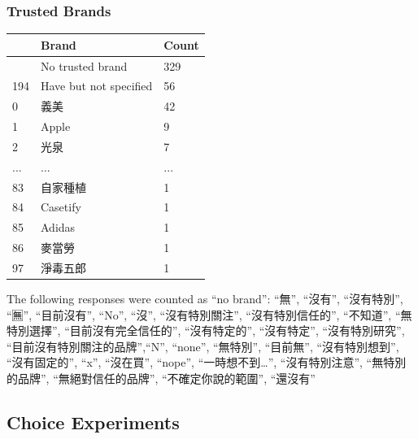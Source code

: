 \documentclass[
  letterpaper,
  DIV=11,
  numbers=noendperiod]{scrartcl}
\begin{document}
\subsubsection{Trusted Brands}\label{trusted-brands}

\begin{longtable}[]{@{}lll@{}}
\toprule\noalign{}
& Brand & Count \\
\midrule\noalign{}
\endhead
\bottomrule\noalign{}
\endlastfoot
193 & No trusted brand & 329 \\
194 & Have but not specified & 56 \\
0 & 義美 & 42 \\
1 & Apple & 9 \\
2 & 光泉 & 7 \\
... & ... & ... \\
83 & 自家種植 & 1 \\
84 & Casetify & 1 \\
85 & Adidas & 1 \\
86 & 麥當勞 & 1 \\
97 & 淨毒五郎 & 1 \\
\end{longtable}

The following responses were counted as ``no brand'': ``無'', ``沒有'',
``沒有特別'', ``🈚️'', ``目前沒有'', ``No'', ``沒'', ``沒有特別關注'',
``沒有特別信任的'', ``不知道'', ``無特別選擇'', ``目前沒有完全信任的'',
``沒有特定的'', ``沒有特定'', ``沒有特別研究'',
``目前沒有特別關注的品牌'',``N'', ``none'', ``無特別'', ``目前無'',
``沒有特別想到'', ``沒有固定的'', ``x'', ``沒在買'', ``nope'',
``一時想不到\ldots{}'', ``沒有特別注意'', ``無特別的品牌'',
``無絕對信任的品牌'', ``不確定你說的範圍'', ``還沒有''

\subsection{Choice Experiments}\label{choice-experiments}
\end{document}
